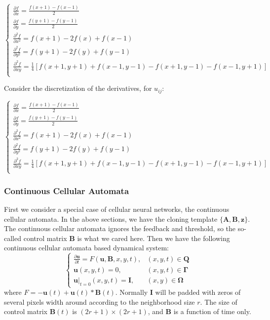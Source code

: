 \documentclass{amsart}
\theoremstyle{definition}
\theoremstyle{remark}
\numberwithin{equation}{section}
\begin{document}
\begin{equation}
  \begin{cases}
  \frac{\partial f}{\partial x} = \frac{f(x+1) - f(x-1)}{2} \\
  \frac{\partial f}{\partial y} = \frac{f(y+1) - f(y-1)}{2} \\
  \frac{\partial ^2 f}{\partial x^2} = f(x+1) - 2f(x) + f(x-1) \\
  \frac{\partial ^2 f}{\partial y^2} = f(y+1) - 2f(y) + f(y-1) \\
  \frac{\partial ^2 f}{\partial xy} =  \frac{1}{4}[ f(x+1, y+1) + f(x-1, y-1) - f(x+1, y-1) - f(x-1, y+1)]\\
    \end{cases}
\end{equation}

Consider the discretization of the derivatives, for $u_{ij}$:

\begin{equation}
  \begin{cases}
  \frac{\partial f}{\partial x} = \frac{f(x+1) - f(x-1)}{2} \\
  \frac{\partial f}{\partial y} = \frac{f(y+1) - f(y-1)}{2} \\
  \frac{\partial ^2 f}{\partial x^2} = f(x+1) - 2f(x) + f(x-1) \\
  \frac{\partial ^2 f}{\partial y^2} = f(y+1) - 2f(y) + f(y-1) \\
  \frac{\partial ^2 f}{\partial xy} =  \frac{1}{4}[ f(x+1, y+1) + f(x-1, y-1) - f(x+1, y-1) - f(x-1, y+1)]\\
    \end{cases}
\end{equation}






\subsubsection{Continuous Cellular Automata}
First we consider a special case of cellular neural networks, the continuous cellular automata. 
In the above sections, we have the cloning template $\{\mathbf{A}, \mathbf{B}, \mathbf{z}\}$. The continuous cellular automata ignores the feedback and threshold, so the so-called control matrix $\mathbf{B}$ is what we cared here.
Then we have the following continuous cellular automata based dynamical system:
\begin{equation}
\label{cnnEvolution}
  \begin{cases}
    \frac{\partial \mathbf{u}}{\partial t} = F(\mathbf{u},  \mathbf{B}, x, y, t), &  (x, y, t) \in \mathbf{Q}\\
	\mathbf{u}(x, y, t) = 0, & (x, y, t) \in  \mathbf{\Gamma} \\
	\mathbf{u}|_{t=0}(x, y, t) = \mathbf{I}, & (x, y)\in \mathbf{\Omega}
  \end{cases}
\end{equation}
where 
$F = -  \mathbf{u}(t)  + \mathbf{u}(t) * \mathbf{B}(t)$.
Normally $\mathbf{I}$ will be padded with zeros of several pixels width around according to the neighborhood size $r$.
The size of control matrix $\mathbf{B}(t)$ is $(2r + 1) \times (2r + 1)$, and $\mathbf{B} $ is a function of time only.
\end{document}
